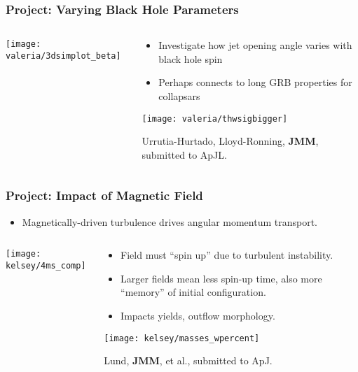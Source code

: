 \documentclass[]{beamer}
\begin{document}
\begin{frame}
  \frametitle{Project: Varying Black Hole Parameters}
  \begin{columns}
    \begin{column}{4cm}
      \begin{center}
        \texttt{[image: valeria/3dsimplot\_beta]}
      \end{center}
    \end{column}
    \begin{column}{8cm}
      \begin{itemize}
      \item Investigate how jet opening angle varies with black hole spin
      \item Perhaps connects to long GRB properties for collapsars
      \end{itemize}
      \begin{center}
        \texttt{[image: valeria/thwsigbigger]}
      \end{center}
      {\footnotesize Urrutia-Hurtado, Lloyd-Ronning, \textbf{JMM}, submitted to ApJL.}
    \end{column}
  \end{columns}
\end{frame}

\begin{frame}
  \frametitle{Project: Impact of Magnetic Field}
  \begin{itemize}
  \item Magnetically-driven turbulence drives angular momentum transport.
  \end{itemize}
  \begin{columns}
    \begin{column}{2.5cm}
      \begin{center}
        \texttt{[image: kelsey/4ms\_comp]}
      \end{center}
    \end{column}
    \begin{column}{9.5cm}
      \begin{itemize}
      \item Field must ``spin up'' due to turbulent instability.
      \item Larger fields mean less spin-up time, also more ``memory''
        of initial configuration.
      \item Impacts yields, outflow morphology.
      \end{itemize}
      \begin{center}
        \texttt{[image: kelsey/masses\_wpercent]}
      \end{center}
      {\footnotesize Lund, \textbf{JMM}, et al., submitted to ApJ.}
    \end{column}
  \end{columns}
\end{frame}
\end{document}
